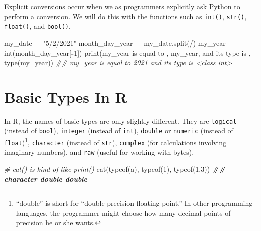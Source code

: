 \documentclass[
  12pt,
  krantz2]{krantz}
\makeatletter
\newenvironment{Shaded}{\begin{snugshade}}{\end{snugshade}}
\newcommand{\BuiltInTok}[1]{#1}
\newcommand{\CommentTok}[1]{\textcolor[rgb]{0.37,0.37,0.37}{\textit{#1}}}
\newcommand{\DecValTok}[1]{\textcolor[rgb]{0.06,0.06,0.06}{#1}}
\newcommand{\DocumentationTok}[1]{\textcolor[rgb]{0.37,0.37,0.37}{\textbf{\textit{#1}}}}
\newcommand{\FloatTok}[1]{\textcolor[rgb]{0.06,0.06,0.06}{#1}}
\newcommand{\FunctionTok}[1]{\textcolor[rgb]{0,0,0}{#1}}
\newcommand{\NormalTok}[1]{#1}
\newcommand{\OperatorTok}[1]{\textcolor[rgb]{0.43,0.43,0.43}{\textbf{#1}}}
\newcommand{\StringTok}[1]{\textcolor[rgb]{0.5,0.5,0.5}{#1}}
\newenvironment{kframe}{%
\medskip{}
\setlength{\fboxsep}{.8em}
 \def\at@end@of@kframe{}%
 \ifinner\ifhmode%
  \def\at@end@of@kframe{\end{minipage}}%
  \begin{minipage}{\columnwidth}%
 \fi\fi%
 \def\FrameCommand##1{\hskip\@totalleftmargin \hskip-\fboxsep
 \colorbox{shadecolor}{##1}\hskip-\fboxsep
     \hskip-\linewidth \hskip-\@totalleftmargin \hskip\columnwidth}%
 \MakeFramed {\advance\hsize-\width
   \@totalleftmargin\z@ \linewidth\hsize
   \@setminipage}}%
 {\par\unskip\endMakeFramed%
 \at@end@of@kframe}
\renewenvironment{Shaded}{\begin{kframe}}{\end{kframe}}
\makeatother
\begin{document}
Explicit conversions occur when we as programmers explicitly ask Python to perform a conversion. We will do this with the functions such as \texttt{int()}, \texttt{str()}, \texttt{float()}, and \texttt{bool()}.

\begin{Shaded}
\begin{Highlighting}[]
\NormalTok{my\_date }\OperatorTok{=} \StringTok{"5/2/2021"}
\NormalTok{month\_day\_year }\OperatorTok{=}\NormalTok{ my\_date.split(}\StringTok{\textquotesingle{}/\textquotesingle{}}\NormalTok{)}
\NormalTok{my\_year }\OperatorTok{=} \BuiltInTok{int}\NormalTok{(month\_day\_year[}\OperatorTok{{-}}\DecValTok{1}\NormalTok{]) }
\BuiltInTok{print}\NormalTok{(}\StringTok{\textquotesingle{}my\_year is equal to \textquotesingle{}}\NormalTok{, my\_year, }\StringTok{\textquotesingle{}and its type is \textquotesingle{}}\NormalTok{, }\BuiltInTok{type}\NormalTok{(my\_year))}
\CommentTok{\#\# my\_year is equal to  2021 and its type is  \textless{}class \textquotesingle{}int\textquotesingle{}\textgreater{}}
\end{Highlighting}
\end{Shaded}

\hypertarget{basic-types-in-r}{%
\section{Basic Types In R}\label{basic-types-in-r}}

In R, the names of basic types are only slightly different. They are \texttt{logical} (instead of \texttt{bool}), \texttt{integer} (instead of \texttt{int}), \texttt{double} or \texttt{numeric} (instead of \texttt{float})\footnote{``double'' is short for ``double precision floating point.'' In other programming languages, the programmer might choose how many decimal points of precision he or she wants.}, \texttt{character} (instead of \texttt{str}), \texttt{complex} (for calculations involving imaginary numbers), and \texttt{raw} (useful for working with bytes).

\begin{Shaded}
\begin{Highlighting}[]
\CommentTok{\# cat() is kind of like print()}
\FunctionTok{cat}\NormalTok{(}\FunctionTok{typeof}\NormalTok{(}\StringTok{\textquotesingle{}a\textquotesingle{}}\NormalTok{), }\FunctionTok{typeof}\NormalTok{(}\DecValTok{1}\NormalTok{), }\FunctionTok{typeof}\NormalTok{(}\FloatTok{1.3}\NormalTok{))}
\DocumentationTok{\#\# character double double}
\end{Highlighting}
\end{Shaded}
\end{document}
